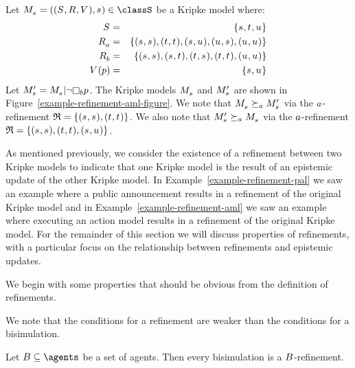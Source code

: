 \begin{example}
Let $\kPModelAndTuple{\kStateS} \in \classS$ be a Kripke model where:
\begin{eqnarray*}
    \kStates &=& \{\kStateS, \kStateT, \kStateU\}\\
    \kAccessibilityA &=& \{(\kStateS, \kStateS), (\kStateT, \kStateT), (\kStateS, \kStateU), (\kStateU, \kStateS), (\kStateU, \kStateU)\}\\
    \kAccessibilityB &=& \{(\kStateS, \kStateS), (\kStateS, \kStateT), (\kStateT, \kStateS), (\kStateT, \kStateT), (\kStateU, \kStateU)\}\\
    \kValuation(\atomP) &=& \{\kStateS, \kStateU\}
\end{eqnarray*}
Let $\kPModelP{\kStateS} = \restrict{\kPModel{\kStateS}}{\lnot \knowsB \atomP}$.
The Kripke models $\kPModel{\kStateS}$ and $\kPModelP{\kStateS}$ are shown in Figure~\ref{example-refinement-aml-figure}.
We note that $\kPModel{\kStateS} \simulatesA \kPModelP{\kStateS}$ via the $a$-refinement $\refinement = \{(\kStateS, \kStateS), (\kStateT, \kStateT)\}$.
We also note that $\kPModelP{\kStateS} \simulatesA \kPModel{\kStateS}$ via the $a$-refinement $\refinement = \{(\kStateS, \kStateS), (\kStateT, \kStateT), (\kStateS, \kStateU)\}$.
\end{example}

As mentioned previously, we consider the existence of a refinement between two Kripke models to indicate that one Kripke model is the result of an epistemic update of the other Kripke model.
In Example~\ref{example-refinement-pal} we saw an example where a public announcement results in a refinement of the original Kripke model and in Example~\ref{example-refinement-aml} we saw an example where executing an action model results in a refinement of the original Kripke model.
For the remainder of this section we will discuss properties of refinements, with a particular focus on the relationship between refinements and epistemic updates.

We begin with some properties that should be obvious from the definition of refinements.

We note that the conditions for a refinement are weaker than the conditions for a bisimulation. 

\begin{proposition}\label{bisimulation-refinement}
Let $\agentsB \subseteq \agents$ be a set of agents. Then every bisimulation is a $B$-refinement.
\end{proposition}


